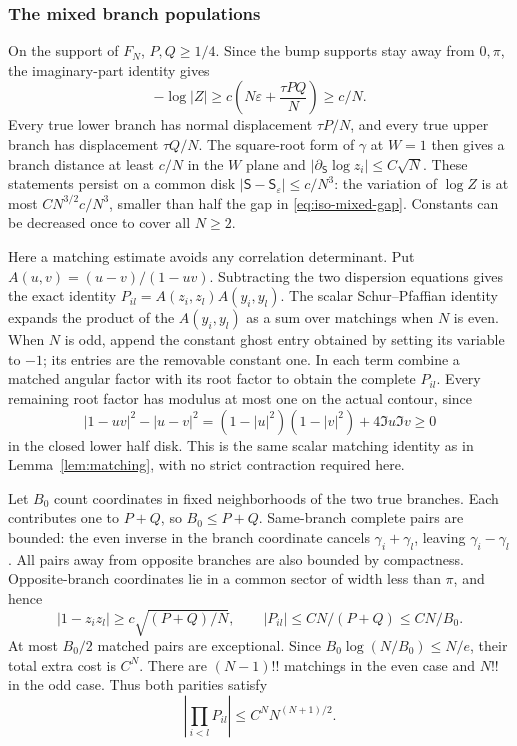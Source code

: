 \documentclass[11pt]{article}
\numberwithin{equation}{section}
\theoremstyle{definition}
\newcommand{\eps}{\varepsilon}
\begin{document}
\subsubsection{The mixed branch populations}

On the support of $F_N$, $P,Q\ge1/4$.  Since the bump supports stay
away from $0,\pi$, the imaginary-part identity gives
\begin{equation}\label{eq:iso-mixed-gap}
 -\log|Z|\ge c\left(N\eps+\frac{\tau PQ}{N}\right)\ge c/N.
\end{equation}
Every true lower branch has normal displacement $\tau P/N$, and every
true upper branch has displacement $\tau Q/N$.  The square-root form
of $\gamma$ at $W=1$ then gives a branch distance at least $c/N$ in
the $W$ plane and $|\partial_{\mathsf S}\log z_i|\le C\sqrt N$.
These statements persist on a common disk
$|\mathsf S-\mathsf S_\eps|\le c/N^3$: the variation of $\log Z$
is at most $CN^{3/2}c/N^3$, smaller than half the gap in
\eqref{eq:iso-mixed-gap}.  Constants can be decreased once to cover
all $N\ge2$.

Here a matching estimate avoids any correlation determinant.
Put $A(u,v)=(u-v)/(1-uv)$.  Subtracting the two dispersion equations
gives the exact identity $P_{il}=A(z_i,z_l)A(y_i,y_l)$.
The scalar Schur--Pfaffian identity expands the product of the
$A(y_i,y_l)$ as a sum over matchings when $N$ is even.  When $N$ is
odd, append the constant ghost entry obtained by setting its variable
to $-1$; its entries are the removable constant one.  In each term
combine a matched angular factor with its root factor to obtain the
complete $P_{il}$.  Every remaining root factor has modulus at most
one on the actual contour, since
\begin{equation}\label{eq:iso-halfdisk-identity}
 |1-uv|^2-|u-v|^2
   =(1-|u|^2)(1-|v|^2)+4\Im u\Im v\ge0
\end{equation}
in the closed lower half disk.  This is the same scalar matching
identity as in Lemma~\ref{lem:matching}, with no strict contraction
required here.

Let $B_0$ count coordinates in fixed neighborhoods of the two true
branches.  Each contributes one to $P+Q$, so $B_0\le P+Q$.
Same-branch complete pairs are bounded: the even inverse in the
branch coordinate cancels $\gamma_i+\gamma_l$, leaving
$\gamma_i-\gamma_l$.  All pairs away from opposite branches are also
bounded by compactness.  Opposite-branch coordinates lie in a common
sector of width less than $\pi$, and hence
\[
 |1-z_i z_l|\ge c\sqrt{(P+Q)/N},\qquad
 |P_{il}|\le CN/(P+Q)\le CN/B_0.
\]
At most $B_0/2$ matched pairs are exceptional.  Since
$B_0\log(N/B_0)\le N/e$, their total extra cost is $C^N$.
There are $(N-1)!!$ matchings in the even case and $N!!$ in the odd
case.  Thus both parities satisfy
\begin{equation}\label{eq:iso-mixed-pairs}
 \left|\prod_{i<l}P_{il}\right|\le C^N N^{(N+1)/2}.
\end{equation}
\end{document}
